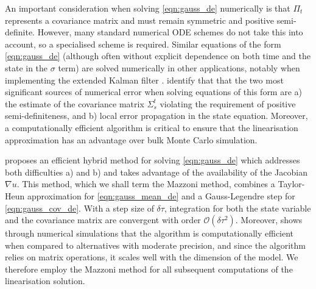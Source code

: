 An important consideration  when solving \cref{eqn:gauss_de} numerically is that \(\Pi_t\) represents a covariance matrix and must remain symmetric and positive semi-definite.
However, many standard numerical ODE schemes do not take this into account, so a specialised scheme is required.
Similar equations of the form \cref{eqn:gauss_de} (although often without explicit dependence on both time and the state in the \(\sigma\) term) are solved numerically in other applications, notably when implementing the extended Kalman filter \citep{Jazwinski_2014_StochasticProcessesFiltering, KulikovaKulikov_2014_AdaptiveODESolvers}.
\citet{KulikovaKulikov_2014_AdaptiveODESolvers} identify that that the two most significant sources of numerical error when solving equations of this form are a) the estimate of the covariance matrix \(\Sigma_s^t\) violating the requirement of positive semi-definiteness, and b) local error propagation in the state equation.
Moreover, a computationally efficient algorithm is critical to ensure that the linearisation approximation has an advantage over bulk Monte Carlo simulation.

\citet{Mazzoni_2008_ComputationalAspectsContinuous} proposes an efficient hybrid method for solving \cref{eqn:gauss_de} which addresses both difficulties a) and b) and takes advantage of the availability of the Jacobian \(\nabla u\).
This method, which we shall term the Mazzoni method, combines a Taylor-Heun approximation for \cref{eqn:gauss_mean_de} and a Gauss-Legendre step for \cref{eqn:gauss_cov_de}.
With a step size of \(\delta \tau\), integration for both the state variable and the covariance matrix are convergent with order \(\mathcal{O}\!\left(\delta \tau^2\right)\).
Moreover, \citet{Mazzoni_2008_ComputationalAspectsContinuous} shows through numerical simulations that the algorithm is computationally efficient when compared to alternatives with moderate precision, and since the algorithm relies on matrix operations, it scales well with the dimension of the model.
We therefore employ the Mazzoni method for all subsequent computations of the linearisation solution.

